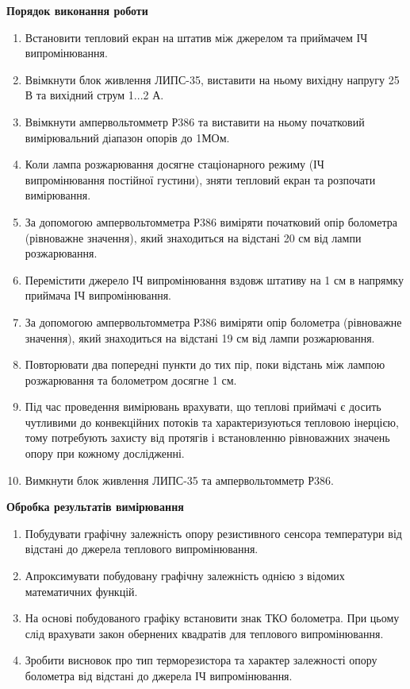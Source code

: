 \documentclass[a4paper,14pt]{extreport}
\begin{document}
\begin{center}
\textbf{Порядок виконання роботи}
\end{center}
\begin{enumerate}
  \item Встановити тепловий екран на штатив між джерелом та приймачем ІЧ
випромінювання.
\item  Ввімкнути блок живлення ЛИПС-35, виставити на ньому вихідну напругу 25
В та вихідний струм 1...2 А.
\item  Ввімкнути ампервольтомметр Р386 та виставити на ньому початковий
вимірювальний діапазон опорів до 1МОм.
\item  Коли лампа розжарювання досягне стаціонарного режиму (ІЧ
випромінювання постійної густини), зняти тепловий екран та розпочати
вимірювання.
\item  За допомогою ампервольтомметра Р386 виміряти початковий опір
болометра (рівноважне значення), який знаходиться на відстані 20 см від
лампи розжарювання.
\item  Перемістити джерело ІЧ випромінювання вздовж штативу на 1 см в
напрямку приймача ІЧ випромінювання.
\item  За допомогою ампервольтомметра Р386 виміряти опір болометра
(рівноважне значення), який знаходиться на відстані 19 см від лампи
розжарювання.
\item  Повторювати два попередні пункти до тих пір, поки відстань між лампою
розжарювання та болометром досягне 1 см.
\item Під час проведення вимірювань врахувати, що теплові приймачі є досить
чутливими до конвекційних потоків та характеризуються тепловою
інерцією, тому потребують захисту від протягів і встановленню рівноважних
значень опору при кожному дослідженні.
\item Вимкнути блок живлення ЛИПС-35 та ампервольтомметр Р386.
\end{enumerate}




\begin{center}
\textbf{Обробка результатів вимірювання}
\end{center}
\begin{enumerate}
\item Побудувати графічну залежність опору резистивного сенсора температури
від відстані до джерела теплового випромінювання.
\item Апроксимувати побудовану графічну залежність однією з відомих математичних функцій.
\item  На основі побудованого графіку встановити знак ТКО болометра. При цьому слід врахувати закон обернених квадратів для теплового випромінювання.
\item  Зробити висновок про тип терморезистора та характер залежності опору болометра від відстані до джерела ІЧ випромінювання.
\end{enumerate}
\clearpage
\newpage
\end{document}
